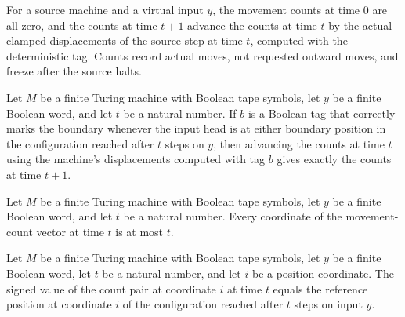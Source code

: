 \begin{definition}
\label{Complexity.clCounts}
\leanok
{}
For a source machine and a virtual input $y$, the movement counts at time $0$ are all zero, and the counts at time $t+1$ advance the counts at time $t$ by the actual clamped displacements of the source step at time $t$, computed with the deterministic tag. Counts record actual moves, not requested outward moves, and freeze after the source halts.
\end{definition}

\begin{lemma}
\label{Complexity.clCounts_succ}
\leanok
{}
Let $M$ be a finite Turing machine with Boolean tape symbols, let $y$ be a finite
Boolean word, and let $t$ be a natural number. If $b$ is a Boolean tag that correctly
marks the boundary whenever the input head is at either boundary position in the
configuration reached after $t$ steps on $y$, then advancing the counts at time $t$
using the machine's displacements computed with tag $b$ gives exactly the counts at time
$t+1$.
\end{lemma}

\begin{lemma}
\label{Complexity.clCounts_bound}
\leanok
{}
Let $M$ be a finite Turing machine with Boolean tape symbols, let $y$ be a finite
Boolean word, and let $t$ be a natural number. Every coordinate of the movement-count
vector at time $t$ is at most $t$.
\end{lemma}

\begin{lemma}
\label{Complexity.clCounts_positions}
\leanok
{}
Let $M$ be a finite Turing machine with Boolean tape symbols, let $y$ be a finite
Boolean word, let $t$ be a natural number, and let $i$ be a position coordinate. The
signed value of the count pair at coordinate $i$ at time $t$ equals the reference
position at coordinate $i$ of the configuration reached after $t$ steps on input $y$.
\end{lemma}


